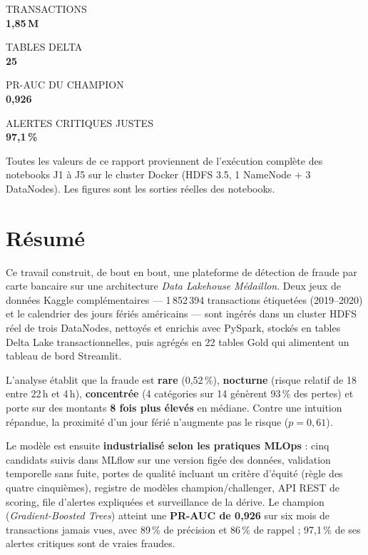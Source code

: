\documentclass[11pt,a4paper]{article}
\newcommand{\kpi}[3]{%
  \begin{tcolorbox}[enhanced,colback=white,colframe=#3,boxrule=0.6pt,arc=3pt,width=\linewidth,
    left=4pt,right=4pt,top=5pt,bottom=5pt,halign=center]
    {\sffamily\footnotesize\color{fl-grey}\MakeUppercase{#1}}\\[1pt]
    {\sffamily\Large\bfseries\color{fl-ink}#2}
  \end{tcolorbox}}
\begin{document}
\begin{titlepage}
\vspace{1.4cm}
\begin{minipage}{0.24\linewidth}\kpi{transactions}{1,85\,M}{fl-blue}\end{minipage}\hfill
\begin{minipage}{0.24\linewidth}\kpi{tables Delta}{25}{fl-blue}\end{minipage}\hfill
\begin{minipage}{0.24\linewidth}\kpi{PR-AUC du champion}{0,926}{fl-orange}\end{minipage}\hfill
\begin{minipage}{0.24\linewidth}\kpi{alertes critiques justes}{97,1\,\%}{fl-orange}\end{minipage}

\vfill
{\sffamily\footnotesize\color{fl-grey}Toutes les valeurs de ce rapport proviennent de l'exécution complète des notebooks J1 à J5 sur le cluster Docker
(HDFS 3.5, 1 NameNode + 3 DataNodes). Les figures sont les sorties réelles des notebooks.}
\end{titlepage}

\section*{Résumé}

Ce travail construit, de bout en bout, une plateforme de détection de fraude par carte bancaire sur une architecture
\emph{Data Lakehouse Médaillon}. Deux jeux de données Kaggle complémentaires — 1\,852\,394 transactions étiquetées
(2019--2020) et le calendrier des jours fériés américains — sont ingérés dans un cluster HDFS réel de trois DataNodes,
nettoyés et enrichis avec PySpark, stockés en tables Delta Lake transactionnelles, puis agrégés en 22 tables Gold qui
alimentent un tableau de bord Streamlit.

L'analyse établit que la fraude est \textbf{rare} (0,52\,\%), \textbf{nocturne} (risque relatif de 18 entre 22\,h et 4\,h),
\textbf{concentrée} (4 catégories sur 14 génèrent 93\,\% des pertes) et porte sur des montants \textbf{8 fois plus élevés}
en médiane. Contre une intuition répandue, la proximité d'un jour férié n'augmente pas le risque ($p = 0{,}61$).

Le modèle est ensuite \textbf{industrialisé selon les pratiques MLOps} : cinq candidats suivis dans MLflow sur une version
figée des données, validation temporelle sans fuite, portes de qualité incluant un critère d'équité (règle des quatre
cinquièmes), registre de modèles champion/challenger, API REST de scoring, file d'alertes expliquées et surveillance de la
dérive. Le champion (\emph{Gradient-Boosted Trees}) atteint une \textbf{PR-AUC de 0,926} sur six mois de transactions jamais vues,
avec 89\,\% de précision et 86\,\% de rappel ; 97,1\,\% de ses alertes critiques sont de vraies fraudes.
\end{document}
